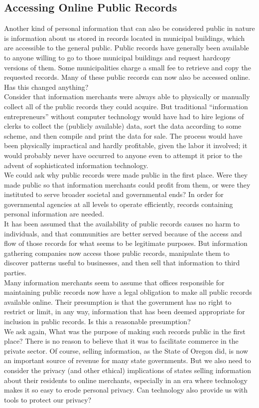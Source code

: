 \documentclass[12pt]{article}
\theoremstyle{definition}
\begin{document}
\subsection{Accessing Online Public Records}
Another kind of personal information that can also be considered public in nature is
information about us stored in records located in municipal buildings, which are
accessible to the general public. Public records have generally been available to anyone willing to go to those municipal buildings and request hardcopy versions of them. Some
municipalities charge a small fee to retrieve and copy the requested records. Many of
these public records can now also be accessed online. Has this changed anything?\\
Consider that information merchants were always able to physically or manually
collect all of the public records they could acquire. But traditional “information
entrepreneurs” without computer technology would have had to hire legions of clerks
to collect the (publicly available) data, sort the data according to some scheme, and then
compile and print the data for sale. The process would have been physically impractical
and hardly profitable, given the labor it involved; it would probably never have occurred
to anyone even to attempt it prior to the advent of sophisticated information technology.\\
We could ask why public records were made public in the first place. Were they made
public so that information merchants could profit from them, or were they instituted to
serve broader societal and governmental ends? In order for governmental agencies at all
levels to operate efficiently, records containing personal information are needed. \\
It has been assumed that the
availability of public records causes no harm to individuals, and that communities are
better served because of the access and flow of those records for what seems to be
legitimate purposes. But information gathering companies now access those public
records, manipulate them to discover patterns useful to businesses, and then sell that
information to third parties.\\
Many information merchants seem to assume that offices responsible for maintaining
public records now have a legal obligation to make all public records available online.
Their presumption is that the government has no right to restrict or limit, in any way,
information that has been deemed appropriate for inclusion in public records. Is this a
reasonable presumption?\\
We ask again, What was the purpose of making such records public in the first place?
There is no reason to believe that it was to facilitate commerce in the private sector.
Of course, selling information, as the State of Oregon did, is now an important source of
revenue for many state governments. But we also need to consider the privacy (and other
ethical) implications of states selling information about their residents to online merchants,
especially in an era where technology makes it so easy to erode personal privacy.
Can technology also provide us with tools to protect our privacy?
\end{document}
